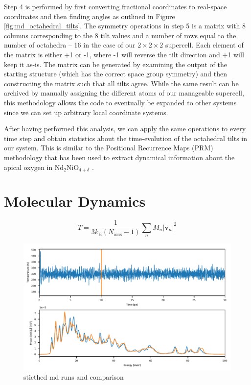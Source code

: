 \noindent Step 4 is performed by first converting fractional coordinates to real-space coordinates and then finding angles as outlined in Figure \ref{fig:md_octahedral_tilts}. The symmetry operations in step 5 is a matrix with 8 columns corresponding to the 8 tilt values and a number of rows equal to the number of octahedra -- 16 in the case of our $2 \times 2 \times 2$ supercell. Each element of the matrix is either +1 or -1, where -1 will reverse the tilt direction and +1 will keep it as-is. The matrix can be generated by examining the output of the starting structure (which has the correct space group symmetry) and then constructing the matrix such that all tilts agree. While the same result can be archived by manually assigning the different atoms of our manageable supercell, this methodology allows the code to eventually be expanded to other systems since we can set up arbitrary local coordinate systems.

After having performed this analysis, we can apply the same operations to every time step and obtain statistics about the time-evolution of the octahedral tilts in our system. This is similar to the Positional Recurrence Maps (PRM) methodology \cite{Piovano2016} that has been used to extract dynamical information about the apical oxygen in Nd$_2$NiO$_{4+\delta}$ \cite{Perrichon2015}.

\section{Molecular Dynamics}
\[ T = \frac{1}{3 k_\text{B} (N_\text{ions}-1)} \sum_n M_n |\bm{v}_n|^2 \]

\begin{figure}
	\centering
	\includegraphics[width=\textwidth]{fig/md/stitch.pdf}
	\caption[stitched md runs]{sticthed md runs and comparison}
	\label{fig:stitch}
\end{figure}

